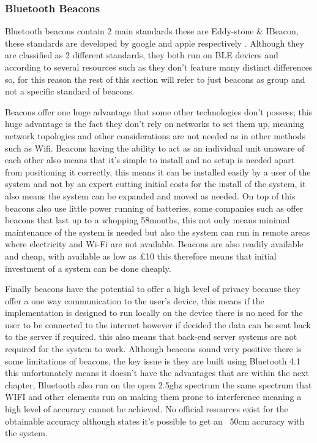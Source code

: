 \subsubsection{Bluetooth Beacons}
Bluetooth beacons contain 2 main standards these are Eddy-stone \& IBeacon, these standards are developed by google and apple respectively \citetemp. Although they are classified as 2 different standards, they both run on BLE devices and according to several resources such as \citetemp they don’t feature many distinct differences so, for this reason the rest of this section will refer to just beacons as group and not a specific standard of beacons.

Beacons offer one huge advantage that some other technologies don't possess; this huge advantage is the fact they don't rely on networks to set them up, meaning network topologies and other considerations are not needed as in other methods such as Wifi. Beacons having the ability to act as an individual unit unaware of each other also means that it's simple to install and no setup is needed apart from positioning it correctly, this means it can be installed easily by a user of the system and not by an expert cutting initial costs for the install of the system, it also means the system can be expanded and moved as needed. On top of this beacons also use little power running of batteries, some companies such as \citetemp offer beacons that last up to a whopping 58months,  this not only means minimal maintenance of the system is needed but also the system can run in remote areas where electricity and Wi-Fi are not available. Beacons are also readily available and cheap, with available as low as £10 \citetemp this therefore means that initial investment of a system can be done cheaply.

Finally beacons have the potential to offer a high level of privacy because they offer a one way communication to the user's device, this means if the implementation is designed to run locally on the device there is no need for the user to be connected to the internet however if decided the data can be sent back to the server if required. this also means that back-end server systems are not required for the system to work. Although beacons sound very positive there is some limitations of beacons, the key issue is they are built using Bluetooth 4.1 \citetemp this unfortunately means it doesn't have the advantages that are within the next chapter, Bluetooth also run on the open 2.5ghz spectrum the same spectrum that WIFI and other elements run on making them prone to interference meaning a high level of accuracy cannot be achieved. No official resources exist for the obtainable accuracy although \citetemp states it's possible to get an ~50cm accuracy with the system.
